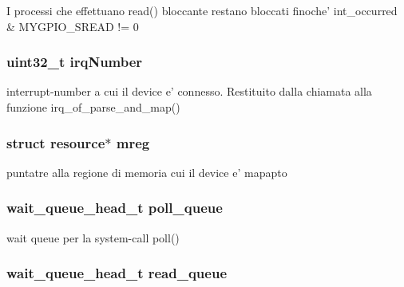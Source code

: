 I processi che effettuano read() bloccante restano bloccati finoche' int\+\_\+occurred \& M\+Y\+G\+P\+I\+O\+\_\+\+S\+R\+E\+A\+D != 0 \hypertarget{structmy_g_p_i_o_k__t_a42a1593ebe61611c4e29413903a373a5}{
\subsubsection[{irq\+Number}]{\setlength{\rightskip}{0pt plus 5cm}uint32\+\_\+t irq\+Number}}\label{structmy_g_p_i_o_k__t_a42a1593ebe61611c4e29413903a373a5}
interrupt-\/number a cui il device e' connesso. Restituito dalla chiamata alla funzione irq\+\_\+of\+\_\+parse\+\_\+and\+\_\+map() \hypertarget{structmy_g_p_i_o_k__t_a18c4eb95350c67ccb239a8a39c43c09a}{
\subsubsection[{mreg}]{\setlength{\rightskip}{0pt plus 5cm}struct resource$\ast$ mreg}}\label{structmy_g_p_i_o_k__t_a18c4eb95350c67ccb239a8a39c43c09a}
puntatre alla regione di memoria cui il device e' mapapto \hypertarget{structmy_g_p_i_o_k__t_a2080617f88cafd765430573afe7701d1}{
\subsubsection[{poll\+\_\+queue}]{\setlength{\rightskip}{0pt plus 5cm}wait\+\_\+queue\+\_\+head\+\_\+t poll\+\_\+queue}}\label{structmy_g_p_i_o_k__t_a2080617f88cafd765430573afe7701d1}
wait queue per la system-\/call poll() \hypertarget{structmy_g_p_i_o_k__t_a251570f8e6976ad87411093e330e7b4f}{
\subsubsection[{read\+\_\+queue}]{\setlength{\rightskip}{0pt plus 5cm}wait\+\_\+queue\+\_\+head\+\_\+t read\+\_\+queue}}\label{structmy_g_p_i_o_k__t_a251570f8e6976ad87411093e330e7b4f}
